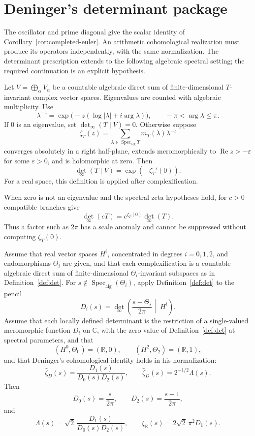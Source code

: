 \section{Deninger's determinant package}

The oscillator and prime diagonal give the scalar identity of
Corollary~\ref{cor:completed-euler}. An arithmetic cohomological
realization must produce its operators independently, with the same
normalization. The determinant prescription extends to the following
algebraic spectral setting; the required continuation is an explicit
hypothesis.

\begin{definition}
\label{def:det}
Let \(V=\bigoplus_\alpha V_\alpha\) be a countable algebraic direct sum of
finite-dimensional \(T\)-invariant complex vector spaces.  Eigenvalues are
counted with algebraic multiplicity.  Use
\[
 \lambda^{-z}=\exp\!\bigl(-z(\log|\lambda|+i\arg\lambda)\bigr),
 \qquad -\pi<\arg\lambda\leq\pi.
\]
If \(0\) is an eigenvalue, set \(\det_\infty(T\mid V)=0\).  Otherwise
suppose
\[
 \zeta_T(z)=\sum_{\lambda\in\operatorname{Spec}_{\mathrm{alg}}T}
 m_T(\lambda)\lambda^{-z}
\]
converges absolutely in a right half-plane, extends meromorphically to
\(\operatorname{Re}z>-\varepsilon\) for some \(\varepsilon>0\), and is
holomorphic at zero.  Then
\[
 \det_\infty(T\mid V)=\exp(-\zeta_T'(0)).
\]
For a real space, this definition is applied after complexification.
\end{definition}

When zero is not an eigenvalue and the spectral zeta hypotheses hold,
for \(c>0\) compatible branches give
\[
 \det_\infty(cT)=c^{\zeta_T(0)}\det_\infty(T).
\]
Thus a factor such as \(2\pi\) has a scale anomaly and cannot be suppressed
without computing \(\zeta_T(0)\).

\begin{theorem}
\label{thm:deninger}
Assume that real vector spaces \(H^i\), concentrated in degrees
\(i=0,1,2\), and endomorphisms \(\Theta_i\) are given, and that each
complexification is a countable algebraic direct sum of finite-dimensional
\(\Theta_i\)-invariant subspaces as in Definition~\ref{def:det}.  For
\(s\notin\operatorname{Spec}_{\mathrm{alg}}(\Theta_i)\), apply
Definition~\ref{def:det} to the pencil
\[
 D_i(s)=\det_\infty\left(
 \frac{s-\Theta_i}{2\pi}\,\middle|\,H^i\right).
\]
Assume that each locally defined determinant is the restriction of a
single-valued meromorphic function \(D_i\) on \(\mathbb C\), with the zero
value of Definition~\ref{def:det} at spectral parameters, and that
\[
 (H^0,\Theta_0)=(\mathbb R,0),
 \qquad (H^2,\Theta_2)=(\mathbb R,1),
\]
and that Deninger's cohomological identity holds in his normalization:
\[
 \widehat\zeta_D(s)=\frac{D_1(s)}{D_0(s)D_2(s)},
 \qquad \widehat\zeta_D(s)=2^{-1/2}\Lambda(s).
\]
Then
\[
 D_0(s)=\frac{s}{2\pi},\qquad
 D_2(s)=\frac{s-1}{2\pi},
\]
and
\[
 \Lambda(s)=\sqrt2\,\frac{D_1(s)}{D_0(s)D_2(s)},
 \qquad
 \xi_{\mathbb R}(s)=2\sqrt2\,\pi^2D_1(s).
\]
\end{theorem}

